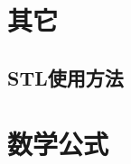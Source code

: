 \documentclass[openany, a4paper, 10pt]{book}
\begin{document}
\begin{spacing}{1.0}
	\chapter{其它}
		\section{STL使用方法}
			
	\chapter{数学公式}
		
	\end{spacing}
\end{document}
